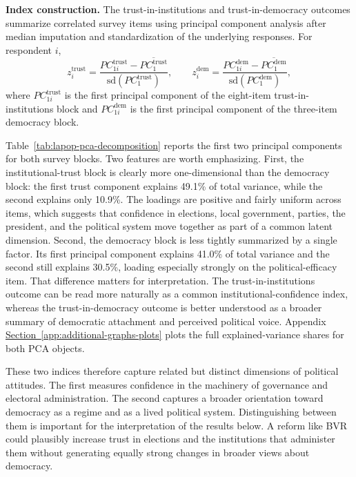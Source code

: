 \textbf{Index construction.} The trust-in-institutions and trust-in-democracy outcomes summarize correlated survey items using principal component analysis after median imputation and standardization of the underlying responses. For respondent $i$,
\begin{equation}
\label{eq:lapop-pca}
z^{\text{trust}}_i = \frac{PC^{\text{trust}}_{1i} - \overline{PC^{\text{trust}}_{1}}}{\mathrm{sd}(PC^{\text{trust}}_{1})},
\qquad
z^{\text{dem}}_i = \frac{PC^{\text{dem}}_{1i} - \overline{PC^{\text{dem}}_{1}}}{\mathrm{sd}(PC^{\text{dem}}_{1})},
\end{equation}
where $PC^{\text{trust}}_{1i}$ is the first principal component of the eight-item trust-in-institutions block and $PC^{\text{dem}}_{1i}$ is the first principal component of the three-item democracy block.

\begin{table}[htbp]
    \caption{PCA Decomposition of the Trust and Democracy Indices}
    \label{tab:lapop-pca-decomposition}
    \centering
    
\end{table}

Table~\ref{tab:lapop-pca-decomposition} reports the first two principal components for both survey blocks. Two features are worth emphasizing. First, the institutional-trust block is clearly more one-dimensional than the democracy block: the first trust component explains 49.1\% of total variance, while the second explains only 10.9\%. The loadings are positive and fairly uniform across items, which suggests that confidence in elections, local government, parties, the president, and the political system move together as part of a common latent dimension. Second, the democracy block is less tightly summarized by a single factor. Its first principal component explains 41.0\% of total variance and the second still explains 30.5\%, loading especially strongly on the political-efficacy item. That difference matters for interpretation. The trust-in-institutions outcome can be read more naturally as a common institutional-confidence index, whereas the trust-in-democracy outcome is better understood as a broader summary of democratic attachment and perceived political voice. Appendix \hyperref[app:additional-graphs-plots]{Section~\ref*{app:additional-graphs-plots}} plots the full explained-variance shares for both PCA objects.

These two indices therefore capture related but distinct dimensions of political attitudes. The first measures confidence in the machinery of governance and electoral administration. The second captures a broader orientation toward democracy as a regime and as a lived political system. Distinguishing between them is important for the interpretation of the results below. A reform like BVR could plausibly increase trust in elections and the institutions that administer them without generating equally strong changes in broader views about democracy.

